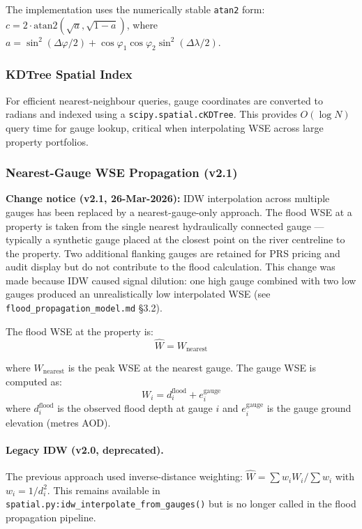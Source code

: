 \documentclass[11pt,a4paper]{article}
\begin{document}
The implementation uses the numerically stable \texttt{atan2} form:
$c = 2 \cdot \text{atan2}(\sqrt{a}, \sqrt{1-a})$, where
$a = \sin^2(\Delta\varphi/2) + \cos\varphi_1 \cos\varphi_2 \sin^2(\Delta\lambda/2)$.

\subsubsection{KDTree Spatial Index}

For efficient nearest-neighbour queries, gauge coordinates are converted to radians and
indexed using a \texttt{scipy.spatial.cKDTree}. This provides $O(\log N)$ query time
for gauge lookup, critical when interpolating WSE across large property portfolios.

\subsubsection{Nearest-Gauge WSE Propagation (v2.1)}

\textbf{Change notice (v2.1, 26-Mar-2026):} IDW interpolation across multiple gauges has
been replaced by a nearest-gauge-only approach. The flood WSE at a property is taken from
the single nearest hydraulically connected gauge --- typically a synthetic gauge placed at
the closest point on the river centreline to the property. Two additional flanking gauges
are retained for PRS pricing and audit display but do not contribute to the flood
calculation. This change was made because IDW caused signal dilution: one high gauge
combined with two low gauges produced an unrealistically low interpolated WSE (see
\texttt{flood\_propagation\_model.md} \S3.2).

The flood WSE at the property is:
\begin{equation}
    \hat{W} = W_{\text{nearest}}
    \label{eq:nearest_wse}
\end{equation}

\noindent where $W_{\text{nearest}}$ is the peak WSE at the nearest gauge. The gauge WSE
is computed as:
\begin{equation}
    W_i = d_i^{\text{flood}} + e_i^{\text{gauge}}
    \label{eq:gauge_wse}
\end{equation}
\noindent where $d_i^{\text{flood}}$ is the observed flood depth at gauge $i$ and
$e_i^{\text{gauge}}$ is the gauge ground elevation (metres AOD).

\paragraph{Legacy IDW (v2.0, deprecated).} The previous approach used inverse-distance
weighting: $\hat{W} = \sum w_i W_i / \sum w_i$ with $w_i = 1/d_i^2$. This remains
available in \texttt{spatial.py:idw\_interpolate\_from\_gauges()} but is no longer called
in the flood propagation pipeline.
\end{document}
